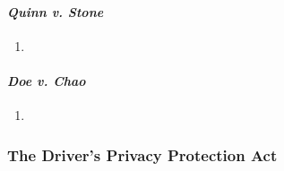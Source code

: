 
\paragraph{\emph{Quinn v. Stone}} %

\begin{enumerate}
    \item 
\end{enumerate}

\paragraph{\emph{Doe v. Chao}} %

\begin{enumerate}
    \item 
\end{enumerate}

\subsubsection{The Driver's Privacy Protection Act}


